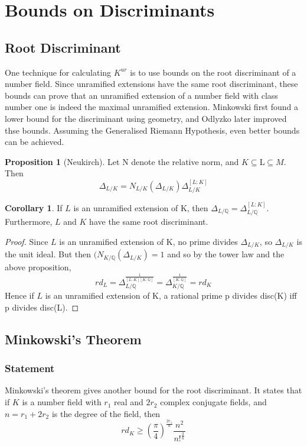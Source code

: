 \documentclass[12pt]{extarticle}
\newcommand{\<}{\langle}
\renewcommand{\>}{\rangle}
\theoremstyle{definition}
\newtheorem{corollary}{Corollary}
\newtheorem{proposition}{Proposition}
\begin{document}
\section{Bounds on Discriminants}
\subsection{Root Discriminant}
One technique for calculating $K^{ur}$ is to use bounds on the root discriminant of a number field. Since unramified extensions have the same root discriminant, these bounds can prove that an unramified extension of a number field with class number one is indeed the maximal unramified extension. Minkowski first found a lower bound for the discriminant using geometry, and Odlyzko later improved thse bounds. Assuming the Generalised Riemann Hypothesis, even better bounds can be achieved. 
\begin{proposition}[Neukirch]
Let N denote the relative norm, and $K\subseteq $L$ \subseteq M $. Then \begin{equation}
    \Delta_{L/K} = N_{L/K}(\Delta_{L/K})\Delta_{L/K}^{[L:K]}
\end{equation}
\end{proposition}
\begin{corollary}
 If $L$ is an unramified extension of K, then $\Delta_{L/\mathbb{Q}}= \Delta_{L/\mathbb{Q}}^{[L:K]}$. Furthermore, $L$ and $K$ have the same root discriminant.
\end{corollary}
\begin{proof}
Since $L$ is an unramified extension of K, no prime divides $\Delta_{L/K}$, so $\Delta_{L/K}$ is the unit ideal. But then $(N_{K/\mathbb{Q}}(\Delta_{L/K})=1$ and so by the tower law and the above proposition, \begin{equation}
    rd_L=\Delta_{L/\mathbb{Q}}^\frac{1}{[L:K][K:\mathbb{Q}]}=\Delta_{K/\mathbb{Q}}^\frac{1}{[K:\mathbb{Q}]}= rd_K
\end{equation}
Hence if $L$ is an unramified extension of K, a rational prime p divides disc(K) iff p divides disc(L).
\end{proof}
\subsection{Minkowski's Theorem}
\subsubsection*{Statement}
Minkowski's theorem gives another bound for the root discriminant. It states that if $K$ is a number field with $r_1$ real and $2r_2$ complex conjugate fields, and $n=r_1+2r_2$ is the degree of the field, then 
\begin{equation}
rd_K\geqslant (\frac{\pi}{4})^{\frac{2r_1}{n}}\frac{n^2}{n!^{\frac{2}{n}}}
\end{equation} 
\end{document}

